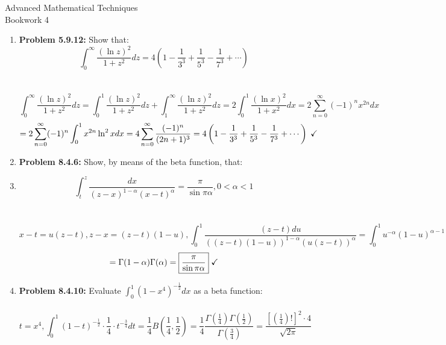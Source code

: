 \documentclass{article}
\begin{document}
\thispagestyle{fancy}
\begin{center}\LARGE{Advanced Mathematical Techniques \\ Bookwork 4}\end{center}
\vspace{10mm}
\begin{enumerate}
    \item \textbf{Problem 5.9.12:} Show that:
    \[\int_{0}^{\infty} \frac{(\ln z)^2}{1+z^2}dz = 4\left( 1 - \frac 1{3^3} + \frac1{5^3} - \frac1{7^3}+\cdots\right)\]
    \\ \\ 
    \[\int_{0}^{\infty} \frac{(\ln z)^2}{1+z^2}dz = \int_{0}^{1} \frac{(\ln z)^2}{1+z^2}dz + \int_{1}^{\infty} \frac{(\ln z)^2}{1+z^2}dz = 2 \int_{0}^{1} \frac{(\ln x)^2}{1+x^2}dx = 2 \sum_{n=0}^{\infty} (-1)^nx^{2n}dx \]
    \[= 2\sum_{n=0}^{\infty} (-1)^n\int_{0}^{1}x^{2n}\ln^2 x dx = 4\sum_{n=0}^{\infty}\frac{(-1)^n}{(2n+1)^3} = 4\left( 1 - \frac 1{3^3} + \frac1{5^3} - \frac1{7^3}+\cdots\right) \hspace{1mm} \checkmark\]
    \item \textbf{Problem 8.4.6:} Show, by means of the beta function, that:
    \item \[\int_{t}^{z}\frac{dx}{(z-x)^{1-\alpha}(x-t)^{\alpha}} = \frac{\pi}{\sin \pi \alpha}, 0 < \alpha < 1\]
    \\ \\ 
    \[x-t = u(z-t), z-x = (z-t)(1-u), \int_{0}^{1}\frac{(z-t)du}{((z-t)(1-u))^{1-\alpha}(u(z-t))^\alpha}= \int_{0}^{1}u^{-\alpha}(1-u)^{\alpha - 1}\]
    \[= \Gamma(1-\alpha)\Gamma(\alpha) = \boxed{\frac{\pi}{\sin \pi \alpha}} \hspace{1mm} \checkmark\]
    \item \textbf{Problem 8.4.10:} Evaluate $\int_{0}^{1} (1-x^4)^{-\frac{1}{2}}dx$ as a beta function:
    \\ \\ 
    \[t = x^4, \int_{0}^{1}(1-t)^{-\frac 1 2} \cdot \frac 1 4 \cdot t^{-\frac 3 4}dt = \frac{1}{4}B(\frac 1 4, \frac 1 2) = \frac{1}{4} \frac{\Gamma(\frac 1 4)\Gamma(\frac 1 2)}{\Gamma(\frac 3 4)} = \boxed{\frac{[(\frac 1 4)!]^2 \cdot 4}{\sqrt{2\pi}}}\]
\end{enumerate}
\end{document}
